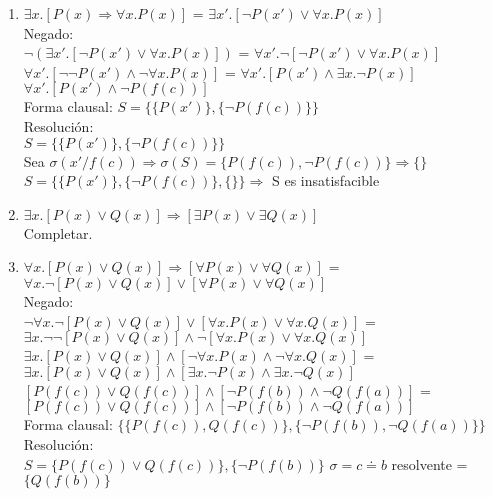 \documentclass[10pt,a4paper]{article}
\begin{document}
\begin{enumerate}
    \item
    $\exists x. [P(x) \Rightarrow \forall x. P(x)]$  =  $\exists x'. [\lnot P(x') \lor \forall x. P(x)]$ \\
    Negado: \\
    $\lnot (\exists x'. [\lnot P(x') \lor \forall x. P(x)])$  =  $ \forall x'. \lnot [\lnot P(x') \lor \forall x. P(x)]$ \\
    $ \forall x'. [ \lnot \lnot P(x') \land \lnot \forall x. P(x)]$  =  $ \forall x'. [ P(x') \land \exists x. \lnot P(x)]$ \\
    $ \forall x'. [ P(x') \land \lnot P(f(c))]$ \\
    Forma clausal: $S=\{ \{ P(x') \} , \{ \lnot P(f(c)) \} \}$ \\
    Resolución: \\
    $S=\{ \{P(x')\}, \{ \lnot P(f(c))\}\}$\\
    Sea $\sigma(x' / f(c)) \Rightarrow \sigma(S)=\{ P(f(c)), \lnot P(f(c))\} \Rightarrow \{\}$ \\
    $S=\{ \{P(x')\}, \{ \lnot P(f(c))\}, \{\} \} \Rightarrow $ S es insatisfacible
    \item
    $ \exists x. [P(x) \lor Q(x)] \Rightarrow [\exists P(x) \lor \exists Q(x)]$ \\
    Completar.
    \item
    $ \forall x. [P(x) \lor Q(x)] \Rightarrow [\forall P(x) \lor \forall Q(x)]$  =  $ \forall x. \lnot [P(x) \lor Q(x)] \lor [\forall P(x) \lor \forall Q(x)]$ \\
    Negado: \\
    $ \lnot \forall x. \lnot [P(x) \lor Q(x)] \lor [\forall x. P(x) \lor \forall x. Q(x)]$  =  $ \exists x. \lnot \lnot [P(x) \lor Q(x)] \land \lnot [\forall x. P(x) \lor \forall x. Q(x)]$ \\
    $ \exists x. [P(x) \lor Q(x)] \land [\lnot \forall x. P(x) \land \lnot \forall x. Q(x)]$  =  $ \exists x. [P(x) \lor Q(x)] \land [\exists x. \lnot P(x) \land \exists x. \lnot Q(x)]$ \\
    $ [P(f(c)) \lor Q(f(c))] \land [\lnot P(f(b)) \land \lnot Q(f(a))]$  =  $ [P(f(c)) \lor Q(f(c))] \land [\lnot P(f(b)) \land \lnot Q(f(a))]$ \\
    Forma clausal: $\{ \{P(f(c)), Q(f(c))\}, \{ \lnot P(f(b)), \lnot Q(f(a))\} \}$ \\
    Resolución:\\
    $S=\{P(f(c)) \lor Q(f(c))\},\{ \lnot P(f(b))\}$ $\sigma= c \doteq b$ resolvente = $\{Q(f(b))\}$ \\

\end{enumerate}
\end{document}
